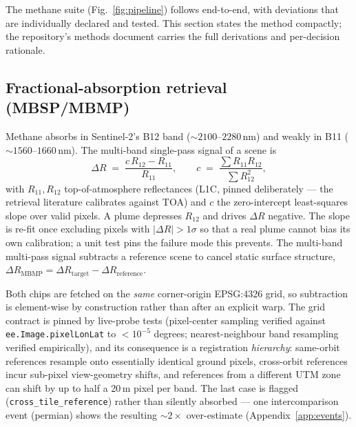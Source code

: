 \documentclass[11pt]{article}
\newcommand{\dR}{\Delta R}
\newcommand{\code}[1]{\texttt{\small #1}}
\begin{document}
The methane suite (Fig.~\ref{fig:pipeline}) follows \citet{varon2021}
end-to-end, with deviations that are individually declared and tested.
This section states the method compactly; the repository's methods
document carries the full derivations and per-decision rationale.

\subsection{Fractional-absorption retrieval (MBSP/MBMP)}\label{sec:retrieval}

Methane absorbs in Sentinel-2's B12 band (${\sim}2100$--$2280\,$nm) and
weakly in B11 (${\sim}1560$--$1660\,$nm). The multi-band single-pass
signal of a scene is
\begin{equation}
  \dR \;=\; \frac{c\,R_{12} - R_{11}}{R_{11}},
  \qquad
  c \;=\; \frac{\sum R_{11} R_{12}}{\sum R_{12}^2},
\end{equation}
with $R_{11}, R_{12}$ top-of-atmosphere reflectances (L1C, pinned
deliberately --- the retrieval literature calibrates against TOA) and $c$
the zero-intercept least-squares slope over valid pixels. A plume
depresses $R_{12}$ and drives $\dR$ negative. The slope is re-fit once
excluding pixels with $|\dR| > 1\sigma$ so that a real plume cannot bias
its own calibration; a unit test pins the failure mode this prevents. The
multi-band multi-pass signal subtracts a reference scene to cancel static
surface structure, $\dR_{\mathrm{MBMP}} = \dR_{\mathrm{target}} -
\dR_{\mathrm{reference}}$.

Both chips are fetched on the \emph{same} corner-origin EPSG:4326 grid, so
subtraction is element-wise by construction rather than after an explicit
warp. The grid contract is pinned by live-probe tests (pixel-center
sampling verified against \code{ee.Image.pixelLonLat} to $<10^{-5}$
degrees; nearest-neighbour band resampling verified empirically), and its
consequence is a registration \emph{hierarchy}: same-orbit references
resample onto essentially identical ground pixels, cross-orbit references
incur sub-pixel view-geometry shifts, and references from a different UTM
zone can shift by up to half a 20\,m pixel per band. The last case is
flagged (\code{cross\_tile\_reference}) rather than silently absorbed ---
one intercomparison event (permian) shows the resulting ${\sim}2\times$
over-estimate (Appendix~\ref{app:events}).

\end{document}
